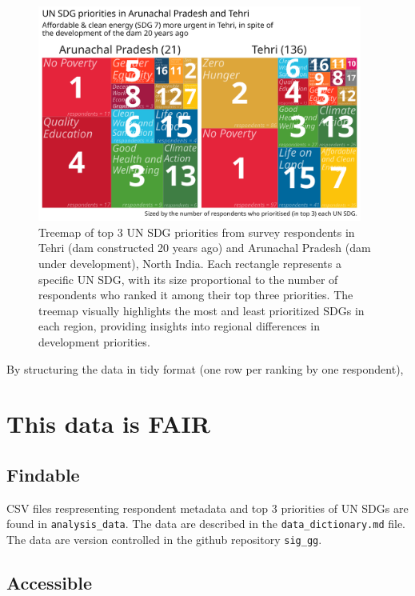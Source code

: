 \documentclass{article}
\begin{document}
\begin{figure}[ht]
  \centering
  \includegraphics[width=0.95\textwidth]{../figures_and_tables/top3-treemap.png}
  \caption{\label{fig:top3-treemap} Treemap of top 3 UN SDG priorities from survey respondents in Tehri (dam constructed 20 years ago) and Arunachal Pradesh (dam under development), North India. Each rectangle represents a specific UN SDG, with its size proportional to the number of respondents who ranked it among their top three priorities. The treemap visually highlights the most and least prioritized SDGs in each region, providing insights into regional differences in development priorities.}
\end{figure}

By structuring the data in tidy format (one row per ranking by one respondent), 

\section{This data is FAIR}

\subsection{Findable}

CSV files respresenting respondent metadata and top 3 priorities of UN SDGs are found in \texttt{analysis\_data}. The data are described in the \texttt{data\_dictionary.md} file. The data are version controlled in the github repository \texttt{sig\_gg}.

\subsection{Accessible}
\end{document}
